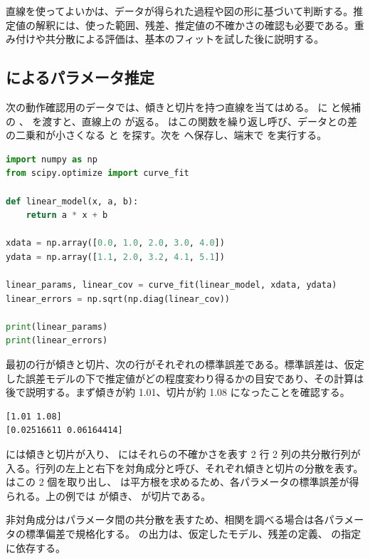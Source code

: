 直線を使ってよいかは、データが得られた過程や図の形に基づいて判断する。推定値の解釈には、使った範囲、残差、推定値の不確かさの確認も必要である。重み付けや共分散による評価は、基本のフィットを試した後に説明する。

\subsection{ によるパラメータ推定}

次の動作確認用のデータでは、傾きと切片を持つ直線を当てはめる。 に  と候補の 、 を渡すと、直線上の  が返る。 はこの関数を繰り返し呼び、データとの差の二乗和が小さくなる  と  を探す。次を  へ保存し、端末で  を実行する。

\begin{lstlisting}[language=Python]
import numpy as np
from scipy.optimize import curve_fit

def linear_model(x, a, b):
    return a * x + b

xdata = np.array([0.0, 1.0, 2.0, 3.0, 4.0])
ydata = np.array([1.1, 2.0, 3.2, 4.1, 5.1])

linear_params, linear_cov = curve_fit(linear_model, xdata, ydata)
linear_errors = np.sqrt(np.diag(linear_cov))

print(linear_params)
print(linear_errors)
\end{lstlisting}

最初の行が傾きと切片、次の行がそれぞれの標準誤差である。標準誤差は、仮定した誤差モデルの下で推定値がどの程度変わり得るかの目安であり、その計算は後で説明する。まず傾きが約 1.01、切片が約 1.08 になったことを確認する。

\begin{lstlisting}[numbers=none, xleftmargin=2\zw]
[1.01 1.08]
[0.02516611 0.06164414]
\end{lstlisting}

 には傾きと切片が入り、 にはそれらの不確かさを表す 2 行 2 列の共分散行列が入る。行列の左上と右下を対角成分と呼び、それぞれ傾きと切片の分散を表す。 はこの 2 個を取り出し、 は平方根を求めるため、各パラメータの標準誤差が得られる。上の例では  が傾き、 が切片である。

非対角成分はパラメータ間の共分散を表すため、相関を調べる場合は各パラメータの標準偏差で規格化する。 の出力は、仮定したモデル、残差の定義、 の指定に依存する。

